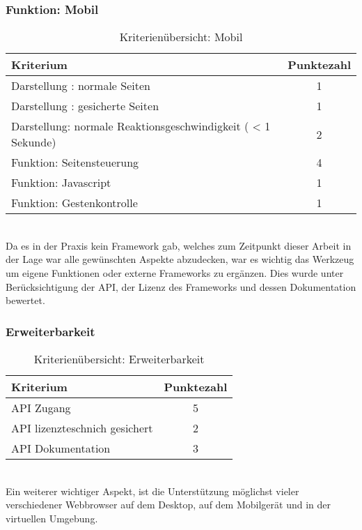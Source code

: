 \subsubsection{Funktion: Mobil}
\begin{table}[H]
 	\vspace{-30pt}
 	\centering
		\begin{tabular}{| p{12cm} | c|}
			\hline
				Kriterium		 &	Punktezahl\\
			\hline
			\hline
				Darstellung : normale Seiten			&1\\
				Darstellung : \gls{gesichert}e Seiten		&	1	\\
				 Darstellung: normale Reaktionsgeschwindigkeit ( < 1 Sekunde)	&	2	\\
				Funktion: Seitensteuerung			&	4	\\
				Funktion: \Gls{Javascript}			&	1	\\
				Funktion: Gestenkontrolle			&	1	\\
				\hline
		\end{tabular}
	\caption{Kriterienübersicht: Mobil}
\end{table}

\\Da es in der Praxis kein \Gls{Framework} gab, welches zum Zeitpunkt dieser Arbeit in der Lage war alle gewünschten Aspekte abzudecken, war es wichtig das Werkzeug um eigene Funktionen oder externe \Gls{Framework}s zu ergänzen. Dies wurde unter Berücksichtigung der API, der Lizenz des \Gls{Framework}s und dessen Dokumentation bewertet.
\subsubsection{Erweiterbarkeit}
\begin{table}[H]
 	\vspace{-30pt}
 	\centering
		\begin{tabular}{| p{12cm} | c|}
			\hline
				Kriterium		 &	Punktezahl\\
			\hline
			\hline
				API Zugang			&5\\
				API lizenzteschnich gesichert	&	2	\\
				API Dokumentation	&	3	\\
				\hline
		\end{tabular}
	\caption{Kriterienübersicht: Erweiterbarkeit}
\end{table}

\\Ein weiterer wichtiger Aspekt, ist die Unterstützung möglichst vieler verschiedener \Gls{Webbrowser} auf dem Desktop, auf dem Mobilgerät und in der virtuellen Umgebung.

